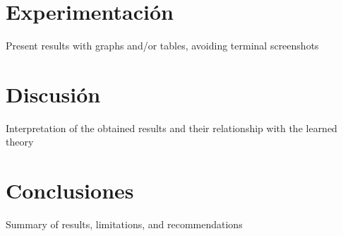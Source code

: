 \documentclass[conference]{IEEEtran}
\begin{document}
\section{Experimentación}
Present results with graphs and/or tables, avoiding terminal screenshots

\section{Discusión}
Interpretation of the obtained results and their relationship with the learned theory

\section{Conclusiones}
Summary of results, limitations, and recommendations
\end{document}
